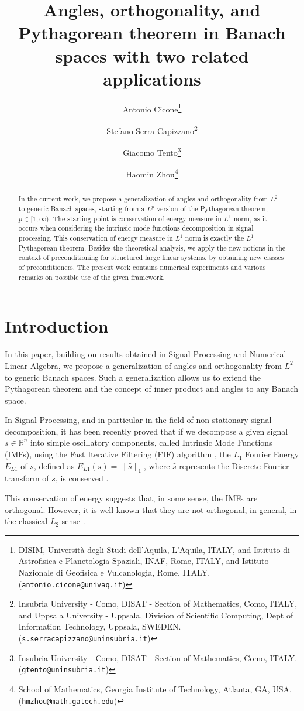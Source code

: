 \documentclass{article}
\title{Angles, orthogonality, and Pythagorean theorem in Banach spaces with two related  applications}
\author{Antonio Cicone\thanks{DISIM, Universit\`a degli Studi dell'Aquila, L'Aquila, ITALY, and Istituto di Astrofisica e Planetologia Spaziali, INAF, Rome, ITALY, and Istituto Nazionale di Geofisica e Vulcanologia, Rome, ITALY. ({\tt antonio.cicone@univaq.it})}
\and
Stefano Serra-Capizzano\thanks{Insubria University - Como, DISAT - Section of Mathematics, Como, ITALY, and Uppsala University - Uppsala, Division of Scientific Computing, Dept of Information Technology, Uppsala, SWEDEN. ({\tt s.serracapizzano@uninsubria.it})}
\and
Giacomo Tento\thanks{Insubria University - Como, DISAT - Section of Mathematics, Como, ITALY. ({\tt gtento@uninsubria.it})}
\and
Haomin Zhou\thanks{School of Mathematics, Georgia Institute of Technology, Atlanta, GA, USA. ({\tt hmzhou@math.gatech.edu})}
}
\def\R{{\mathbb{R}}}
\begin{document}
\maketitle

\begin{abstract}
In the current work, we propose a generalization of  {angles and} orthogonality from $L^2$ to generic Banach spaces, starting from a $L^p$ version of the Pythagorean theorem, $p\in [1,\infty)$. The starting point is conservation of energy measure in $L^1$ norm, as it occurs when considering the intrinsic mode functions decomposition in signal processing. This conservation of energy measure in $L^1$ norm is exactly the $L^1$ Pythagorean theorem. Besides the theoretical analysis, we apply the new notions in the context of preconditioning for structured large linear systems, by obtaining new classes of preconditioners.
The present work contains numerical experiments and various remarks on possible use of the given framework.

\end{abstract}

\section{Introduction}\label{sec:Intro}

In this paper, building on results obtained in Signal Processing and Numerical Linear Algebra, we propose a generalization of {angles and} orthogonality from $L^2$ to generic Banach spaces. Such a generalization allows us to extend the Pythagorean theorem and the concept of inner product and angles to any Banach space.

In Signal Processing, and in particular in the field of non-stationary signal decomposition, it has been recently proved that if we decompose a given signal $s\in\R^n$ into simple oscillatory components, called Intrinsic Mode Functions (IMFs), using the Fast Iterative Filtering (FIF) algorithm \cite{cicone2021numerical}, the $L_1$ Fourier Energy $E_{L1}$ of $s$, defined as $E_{L1}(s)=\|\widehat{s}\|_1$, where $\widehat{s}$ represents the Discrete Fourier transform of $s$, is conserved \cite{cicone2024new}.

This conservation of energy suggests that, in some sense, the IMFs are orthogonal. However, it is well known that they are not orthogonal, in general, in the classical $L_2$ sense \cite{cicone2022multivariate}.
\end{document}
